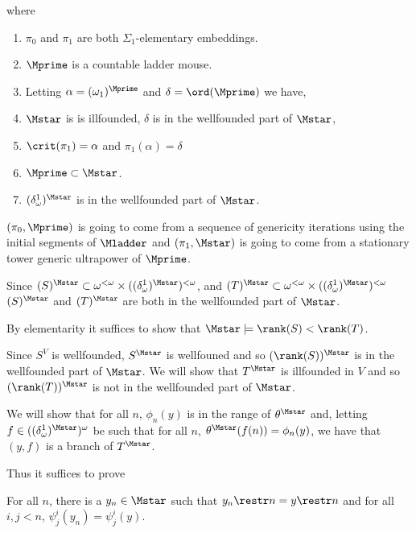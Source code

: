 \documentclass[oneside,12pt]{amsart}
\begin{document}
where

\begin{enumerate}
\item $\pi_0$ and $\pi_1$ are both $\Sigma_1$-elementary embeddings.
\item $\Mprime$ is a countable ladder mouse.
\item Letting $\alpha=(\omega_1)^{\Mprime}$ and $\delta=\ord(\Mprime)$ we have,
\item $\Mstar$ is is illfounded, $\delta$ is in the wellfounded part of $\Mstar$,
\item $\crit(\pi_1) = \alpha$ and $\pi_1(\alpha)=\delta$
\item $\Mprime \subset \Mstar$.
\item $(\delta^1_\omega)^{\Mstar}$ is in the wellfounded part of $\Mstar$.
\end{enumerate}

$(\pi_0, \Mprime)$ is going to come from a sequence of genericity iterations using
the initial segments of $\Mladder$ and $(\pi_1,\Mstar)$
is going to come from a stationary tower generic ultrapower of $\Mprime$.

Since $(S)^{\Mstar} \subset \omega^{<\omega}\times ((\delta^1_\omega)^{\Mstar})^{<\omega}$,
and
$(T)^{\Mstar} \subset \omega^{<\omega}\times ((\delta^1_\omega)^{\Mstar})^{<\omega}$
$(S)^{\Mstar}$ and $(T)^{\Mstar}$ are both in the wellfounded part of $\Mstar$.

By elementarity it suffices to show that $\Mstar \models \rank(S) < \rank(T)$.

Since $S^V$ is wellfounded, $S^{\Mstar}$ is wellfouned and so $(\rank(S))^{\Mstar}$ is in the
wellfounded part of $\Mstar$. We will show that $T^{\Mstar}$
is illfounded in $V$ and so $(\rank(T))^{\Mstar}$ is not in the wellfounded part of $\Mstar$.

We will show that for all $n$, $\phi_n(y)$ is in the range of $\theta^{\Mstar}$ and,
letting $f\in ((\delta^1_\omega)^{\Mstar})^{\omega}$ be such that for all $n$,
$\theta^{\Mstar}(f(n)) = \phi_n(y)$, we have that $(y,f)$ is a branch of $T^{\Mstar}$.

Thus it suffices to prove

\begin{lemma}
For all $n$, there is a $y_n\in \Mstar$ such that $y_n\restr n = y \restr n$ and
for all $i,j < n$, $\psi^i_j(y_n) = \psi^i_j(y)$.
\end{lemma}
\end{document}
